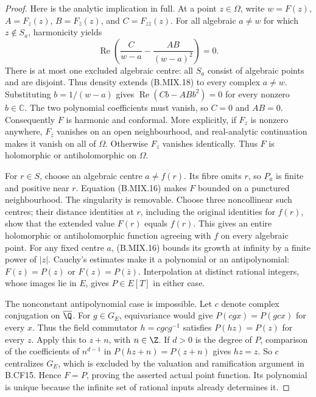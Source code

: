 \begin{proof}
Here is the analytic implication in full. At a point
\(z\in\Omega\), write
\(w=F(z)\), \(A=F_z(z)\), \(B=F_{\bar z}(z)\), and
\(C=F_{z\bar z}(z)\). For all algebraic \(a\ne w\)
for which \(z\notin S_a\), harmonicity yields
\[
 \operatorname{Re}\left(\frac{C}{w-a}
                  -\frac{AB}{(w-a)^2}\right)=0.         \tag{B.MIX.18}
\]
There is at most one excluded algebraic centre: all
\(S_a\) consist of algebraic points and are disjoint.
Thus density extends (B.MIX.18) to every complex
\(a\ne w\). Substituting \(b=1/(w-a)\) gives
\(\operatorname{Re}(Cb-ABb^2)=0\) for every nonzero
\(b\in\mathbb C\). The two polynomial coefficients
must vanish, so \(C=0\) and \(AB=0\).
Consequently \(F\) is harmonic and conformal.
More explicitly, if \(F_z\) is nonzero anywhere,
\(F_{\bar z}\) vanishes on an open neighbourhood, and
real-analytic continuation makes it vanish on all of
\(\Omega\). Otherwise \(F_z\) vanishes identically.
Thus \(F\) is holomorphic or antiholomorphic on \(\Omega\).

For \(r\in S\), choose an algebraic centre
\(a\ne f(r)\). Its fibre omits \(r\), so \(P_a\)
is finite and positive near \(r\). Equation (B.MIX.16)
makes \(F\) bounded on a punctured neighbourhood.
The singularity is removable. Choose three noncollinear
such centres; their distance identities at \(r\),
including the original identities for \(f(r)\), show
that the extended value \(F(r)\) equals \(f(r)\).
This gives an entire holomorphic or antiholomorphic
function agreeing with \(f\) on every algebraic point.
For any fixed centre \(a\), (B.MIX.16) bounds its growth
at infinity by a finite power of \(|z|\). Cauchy's
estimates make it a polynomial or an antipolynomial:
\(F(z)=P(z)\) or \(F(z)=P(\bar z)\).
Interpolation at distinct rational integers, whose
images lie in \(E\), gives \(P\in E[T]\) in either case.

The nonconstant antipolynomial case is impossible.
Let \(c\) denote complex conjugation on \(\overline\Q\).
For \(g\in G_E\), equivariance would give
\(P(cg x)=P(gc x)\) for every \(x\). Thus the field
commutator \(h=cgcg^{-1}\) satisfies \(P(hz)=P(z)\)
for every \(z\). Apply this to \(z+n\), with
\(n\in\Z\). If \(d>0\) is the degree of \(P\),
comparison of the coefficients of \(n^{d-1}\) in
\(P(hz+n)=P(z+n)\) gives \(hz=z\).
So \(c\) centralizes \(G_E\), which is excluded by
the valuation and ramification argument in B.CF15.
Hence \(F=P\), proving the asserted actual point
function. Its polynomial is unique because the infinite
set of rational inputs already determines it.
\end{proof}
